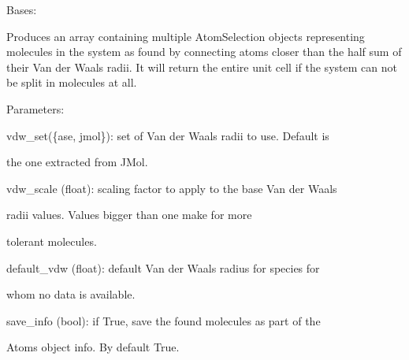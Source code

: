 \documentclass[letterpaper,10pt,english]{sphinxmanual}
\begin{document}
\begin{fulllineitems}
\label{doctree/soprano.properties.linkage.linkage:soprano.properties.linkage.linkage.Molecules}
Bases: {\hyperref[doctree/soprano.properties.atomsproperty:soprano.properties.atomsproperty.AtomsProperty]{}}

Produces an array containing multiple AtomSelection objects representing
molecules in the system as found by connecting atoms closer than the half
sum of their Van der Waals radii. It will return the entire unit cell if
the system can not be split in molecules at all.

\begin{DUlineblock}{0em}
\item[] Parameters:
\item[]
\begin{DUlineblock}{\DUlineblockindent}
\item[] vdw\_set(\{ase, jmol\}): set of Van der Waals radii to use. Default is
\item[]
\begin{DUlineblock}{\DUlineblockindent}
\item[] the one extracted from JMol.
\end{DUlineblock}
\item[] vdw\_scale (float): scaling factor to apply to the base Van der Waals
\item[]
\begin{DUlineblock}{\DUlineblockindent}
\item[] radii values. Values bigger than one make for more
\item[] tolerant molecules.
\end{DUlineblock}
\item[] default\_vdw (float): default Van der Waals radius for species for
\item[]
\begin{DUlineblock}{\DUlineblockindent}
\item[] whom no data is available.
\end{DUlineblock}
\item[] save\_info (bool): if True, save the found molecules as part of the
\item[]
\begin{DUlineblock}{\DUlineblockindent}
\item[] Atoms object info. By default True.
\end{DUlineblock}
\end{DUlineblock}
\end{DUlineblock}


\end{fulllineitems}
\end{document}
